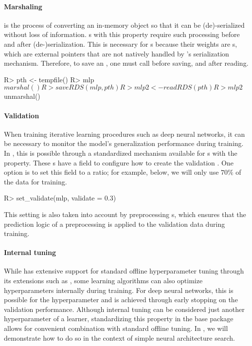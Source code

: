 \documentclass[article]{jss}
\theoremstyle{definition}
\begin{document}
\paragraph{Marshaling} is the process of converting an in-memory object so that it can be (de)-serialized without loss of information.
s with this property require such processing before and after (de-)serialization.
This is necessary for \mlrttorch{} s because their weights are s, which are external pointers that are not natively handled by \rlang{}'s serialization mechanism.
Therefore, to save an \mlrttorch{} , one must call  before saving, and  after reading.

\begin{CodeInput}
R> pth <- tempfile()
R> mlp$marshal()
R> saveRDS(mlp, pth)
R> mlp2 <- readRDS(pth)
R> mlp2$unmarshal()
\end{CodeInput}

\paragraph{Validation}

When training iterative learning procedures such as deep neural networks, it can be necessary to monitor the model's generalization performance during training.
In \mlrt{}, this is possible through a standardized mechanism available for s with the  property.
These s have a  field to configure how to create the validation .
One option is to set this field to a ratio; for example, below, we will only use $70\%$ of the data for training.

\begin{CodeInput}
R> set_validate(mlp, validate = 0.3)
\end{CodeInput}

This setting is also taken into account by preprocessing s, which ensures that the prediction logic of a preprocessing  is applied to the validation data during training.

\paragraph{Internal tuning}

While \mlrt{} has extensive support for standard offline hyperparameter tuning through its extensions such as  \citep{ref-mlr3tuning2024}, some learning algorithms can also optimize hyperparameters internally during training.
For deep neural networks, this is possible for the  hyperparameter and is achieved through early stopping on the validation performance.
Although internal tuning can be considered just another hyperparameter of a learner, standardizing this property in the \mlrt{} base package allows for convenient combination with standard offline tuning.
In , we will demonstrate how to do so in the context of simple neural architecture search.
\end{document}
